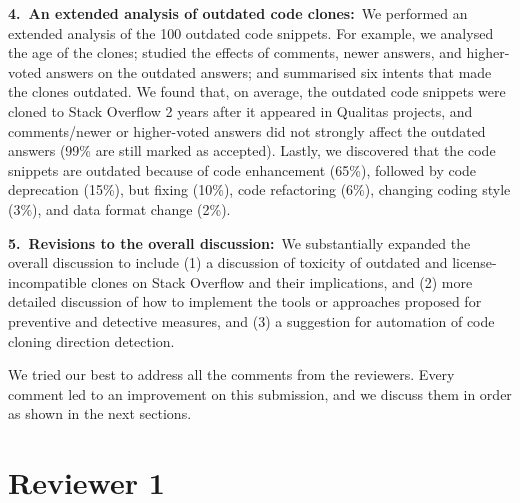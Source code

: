 \documentclass[a4paper,twoside,10pt]{reviewresponse}
\begin{document}
\textbf{4.~An extended analysis of outdated code clones:}~We performed an
extended analysis of the 100 outdated code snippets. For example, we analysed
the age of the clones; studied the effects of comments, newer answers, and higher-voted
answers on the outdated answers; and summarised six intents that made the
clones outdated. We found that, on average, the outdated code snippets were cloned to Stack Overflow
2 years after it appeared in Qualitas projects, and comments/newer or
higher-voted answers did not strongly affect the outdated answers (99\% are
still marked as accepted). Lastly, we discovered that the code snippets are outdated
because of code enhancement (65\%), followed by code deprecation (15\%), but
fixing (10\%), code refactoring (6\%), changing coding style (3\%), and data
format change (2\%).

\textbf{5.~Revisions to the overall discussion:}~We substantially expanded the
overall discussion to include (1) a discussion of toxicity of outdated and
license-incompatible clones on Stack Overflow and their implications, and (2)
more detailed discussion of how to implement the tools or approaches proposed
for preventive and detective measures, and (3) a suggestion for automation of
code cloning direction detection.

\clearpage
We tried our best to address all the comments from the reviewers. Every
comment led to an improvement on this submission, and we discuss them in order as
shown in the next sections.


\clearpage

\section{Reviewer 1}
\end{document}
